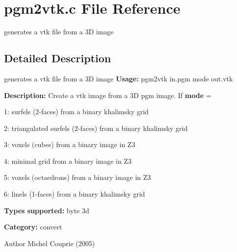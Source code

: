 \section{pgm2vtk.c File Reference}
\label{pgm2vtk_8c}


generates a vtk file from a 3D image  




\subsection{Detailed Description}
generates a vtk file from a 3D image {\bfseries Usage:} pgm2vtk in.pgm mode out.vtk

{\bfseries Description:} Create a vtk image from a 3D pgm image. If {\bfseries mode} = \begin{DoxyItemize}
\item 1: surfels (2-\/faces) from a binary khalimsky grid \item 2: triangulated surfels (2-\/faces) from a binary khalimsky grid \item 3: voxels (cubes) from a binary image in Z3 \item 4: minimal grid from a binary image in Z3 \item 5: voxels (octaedrons) from a binary image in Z3 \item 6: linels (1-\/faces) from a binary khalimsky grid\end{DoxyItemize}
{\bfseries Types supported:} byte 3d

{\bfseries Category:} convert

\begin{DoxyAuthor}{Author}
Michel Couprie (2005) 
\end{DoxyAuthor}
